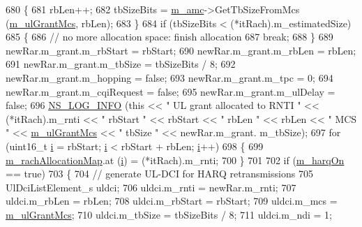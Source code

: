 \begin{DoxyCode}
680         \{
681           rbLen++;
682           tbSizeBits = \hyperlink{classns3_1_1TdMtFfMacScheduler_a2fa1c7abd867e10a52fcd0de82dc6cc1}{m\_amc}->GetTbSizeFromMcs (\hyperlink{classns3_1_1TdMtFfMacScheduler_a2ddc0da4bf65cdd492c7a956580dca6f}{m\_ulGrantMcs}, rbLen);
683         \}
684       \textcolor{keywordflow}{if} (tbSizeBits < (*itRach).m\_estimatedSize)
685         \{
686           \textcolor{comment}{// no more allocation space: finish allocation}
687           \textcolor{keywordflow}{break};
688         \}
689       newRar.m\_grant.m\_rbStart = rbStart;
690       newRar.m\_grant.m\_rbLen = rbLen;
691       newRar.m\_grant.m\_tbSize = tbSizeBits / 8;
692       newRar.m\_grant.m\_hopping = \textcolor{keyword}{false};
693       newRar.m\_grant.m\_tpc = 0;
694       newRar.m\_grant.m\_cqiRequest = \textcolor{keyword}{false};
695       newRar.m\_grant.m\_ulDelay = \textcolor{keyword}{false};
696       \hyperlink{group__logging_gafbd73ee2cf9f26b319f49086d8e860fb}{NS\_LOG\_INFO} (\textcolor{keyword}{this} << \textcolor{stringliteral}{" UL grant allocated to RNTI "} << (*itRach).m\_rnti << \textcolor{stringliteral}{" rbStart "} << 
      rbStart << \textcolor{stringliteral}{" rbLen "} << rbLen << \textcolor{stringliteral}{" MCS "} << \hyperlink{classns3_1_1TdMtFfMacScheduler_a2ddc0da4bf65cdd492c7a956580dca6f}{m\_ulGrantMcs} << \textcolor{stringliteral}{" tbSize "} << newRar.m\_grant.
      m\_tbSize);
697       \textcolor{keywordflow}{for} (uint16\_t \hyperlink{bernuolliDistribution_8m_a6f6ccfcf58b31cb6412107d9d5281426}{i} = rbStart; \hyperlink{bernuolliDistribution_8m_a6f6ccfcf58b31cb6412107d9d5281426}{i} < rbStart + rbLen; \hyperlink{bernuolliDistribution_8m_a6f6ccfcf58b31cb6412107d9d5281426}{i}++)
698         \{
699           \hyperlink{classns3_1_1TdMtFfMacScheduler_a10f3c18ee02b2d7f688c010eba536b26}{m\_rachAllocationMap}.at (\hyperlink{bernuolliDistribution_8m_a6f6ccfcf58b31cb6412107d9d5281426}{i}) = (*itRach).m\_rnti;
700         \}
701 
702       \textcolor{keywordflow}{if} (\hyperlink{classns3_1_1TdMtFfMacScheduler_af0253034544a704cb4d8583fae9377a3}{m\_harqOn} == \textcolor{keyword}{true})
703         \{
704           \textcolor{comment}{// generate UL-DCI for HARQ retransmissions}
705           UlDciListElement\_s uldci;
706           uldci.m\_rnti = newRar.m\_rnti;
707           uldci.m\_rbLen = rbLen;
708           uldci.m\_rbStart = rbStart;
709           uldci.m\_mcs = \hyperlink{classns3_1_1TdMtFfMacScheduler_a2ddc0da4bf65cdd492c7a956580dca6f}{m\_ulGrantMcs};
710           uldci.m\_tbSize = tbSizeBits / 8;
711           uldci.m\_ndi = 1;

\end{DoxyCode}
